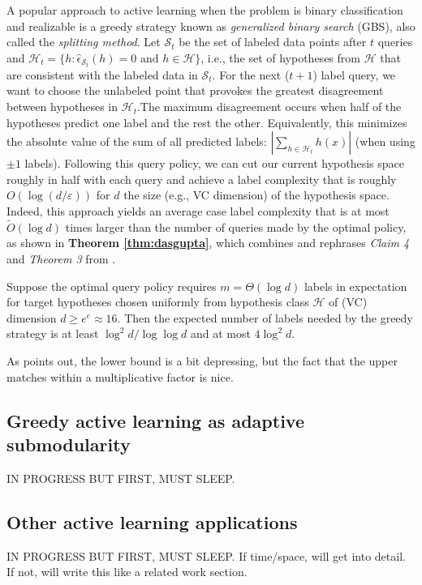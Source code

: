 A popular approach to active learning when the problem is binary classification and realizable is a greedy strategy known as \textit{generalized binary search} (GBS), also called the \textit{splitting method}. Let $\mathcal{S}_t$ be the set of labeled data points after $t$ queries and $\mathcal{H}_t = \{ h : \hat{\epsilon}_{\mathcal{S}_t}(h) = 0 \mbox{ and } h \in \mathcal{H}\}$, i.e., the set of hypotheses from $\mathcal{H}$ that are consistent with the labeled data in $\mathcal{S}_t$. For the next ($t+1$) label query, we want to choose the unlabeled point that provokes the greatest disagreement between hypotheses in $\mathcal{H}_t$.The maximum disagreement occurs when half of the hypotheses predict one label and the rest the other. Equivalently, this minimizes the absolute value of the sum of all predicted labels: $| \sum_{h \in \mathcal{H}_t} h(x)|$ (when using $\pm1$ labels). Following this query policy, we can cut our current hypothesis space roughly in half with each query and achieve a label complexity that is roughly $O(\log (d/\varepsilon))$ for $d$ the size (e.g., VC dimension) of the hypothesis space. Indeed, this approach yields an average case label complexity that is at most $\widetilde{O}(\log d)$ times larger than the number of queries made by the optimal policy, as shown in \textbf{Theorem \ref{thm:dasgupta}}, which combines and rephrases \textit{Claim 4} and \textit{Theorem 3} from \cite{Dasgupta:2004}.

\begin{theorem}\label{thm:dasgupta}
Suppose the optimal query policy requires $m = \Theta(\log d)$ labels in expectation for target hypotheses chosen uniformly from hypothesis class $\mathcal{H}$ of (VC) dimension $d \geq e^e \approx 16$. Then the expected number of labels needed by the greedy strategy is at least $\log^2 d / \log \log d$ and at most $4 \log^2 d$.
\end{theorem}

As \cite{Dasgupta:2004} points out, the lower bound is a bit depressing, but the fact that the upper matches within a multiplicative factor is nice.

\subsection{Greedy active learning as adaptive submodularity}
IN PROGRESS BUT FIRST, MUST SLEEP.

\subsection{Other active learning applications}
IN PROGRESS BUT FIRST, MUST SLEEP. If time/space, will get into detail. If not, will write this like a related work section.

